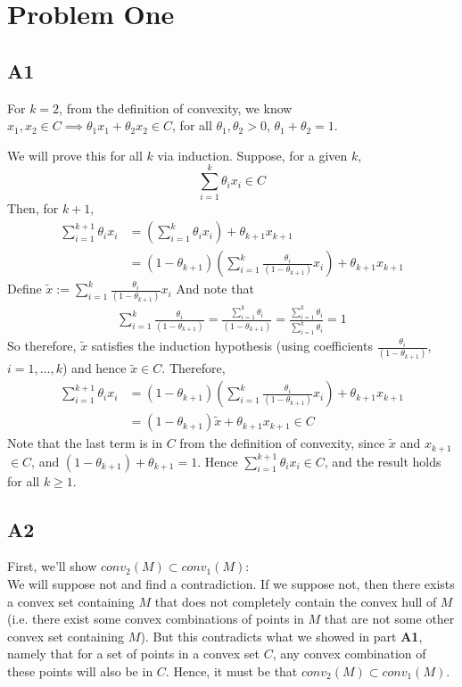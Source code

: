 

\section{Problem One}

\subsection{A1}
For $k=2$, from the definition of convexity, we know $x_1,x_2 \in C \implies
\theta_1 x_1 + \theta_2 x_2 \in C$,  for all $\theta_1,\theta_2>0$,
$\theta_1+\theta_2 = 1$.

We will prove this for all $k$ via induction. Suppose, for a given $k$, 
\begin{equation}
    \sum_{i=1}^k \theta_i x_i  \in C
\end{equation}
Then, for $k+1$, 
\begin{align}
    \sum_{i=1}^{k+1} \theta_i x_i  &= \left( \sum_{i=1}^k \theta_i x_i
  \right) + \theta_{k+1}x_{k+1} \\ &= (1-\theta_{k+1}) \left( \sum_{i=1}^k
    \frac{\theta_i}{(1-\theta_{k+1})} x_i \right) + \theta_{k+1}x_{k+1}
\end{align}
Define $\tilde{x} := \sum_{i=1}^k \frac{\theta_i}{(1-\theta_{k+1})} x_i$ And
note that
\begin{align}
    \sum_{i=1}^k \frac{\theta_i}{(1-\theta_{k+1})} = \frac{\sum_{i=1}^k
    \theta_i}{(1-\theta_{k+1})} = \frac{\sum_{i=1}^k \theta_i}{\sum_{i=1}^k
    \theta_i} = 1
\end{align}
So therefore, $\tilde{x}$ satisfies the induction hypothesis (using coefficients
$\frac{\theta_i}{(1-\theta_{k+1})}$, $i=1,\ldots,k$) and hence $\tilde{x} \in C$. Therefore,
\begin{align}
    \sum_{i=1}^{k+1} \theta_i x_i &= (1-\theta_{k+1}) \left( \sum_{i=1}^k
    \frac{\theta_i}{(1-\theta_{k+1})} x_i \right) + \theta_{k+1}x_{k+1} \\ &=
    (1-\theta_{k+1}) \tilde{x} + \theta_{k+1}x_{k+1} \in C
\end{align}
Note that the last term is in $C$ from the definition of convexity, since $\tilde{x}$ and
$x_{k+1}$ $\in C$, and $(1-\theta_{k+1}) + \theta_{k+1} = 1$.  Hence
$\sum_{i=1}^{k+1} \theta_i x_i \in C$, and the result holds for all $k \geq 1$.


\subsection{A2}
First, we'll show $conv_2(M) \subset conv_1(M)$:\\ We will suppose not and find
a contradiction. If we suppose not, then there exists a convex set containing
$M$ that does not completely contain the convex hull of $M$ (i.e. there exist
some convex combinations of points in $M$ that are not some other convex set
containing $M$). But this contradicts what we showed in part \textbf{A1},
namely that for a set of points in a convex set $C$, any convex combination of
these points will also be in $C$. Hence, it must be that $conv_2(M) \subset
conv_1(M)$.

